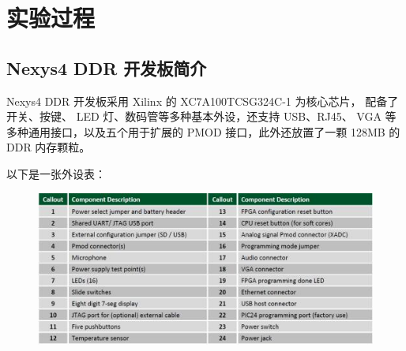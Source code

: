 \documentclass[UTF8]{article}
\begin{document}
	\section{实验过程}
	\subsection{Nexys4 DDR 开发板简介}
	Nexys4 DDR 开发板采用 Xilinx 的 XC7A100TCSG324C-1 为核心芯片， 配备了开关、按键、 LED 灯、数码管等多种基本外设，还支持 USB、RJ45、 VGA 等多种通用接口，以及五个用于扩展的 PMOD 接口，此外还放置了一颗 128MB 的 DDR 内存颗粒。\par
	以下是一张外设表：\par
	\begin{figure}[H]
		\centering
		\includegraphics[width=1\linewidth]{s1.jpg}
		\label{s1}
	\end{figure}\par
	
\end{document}
